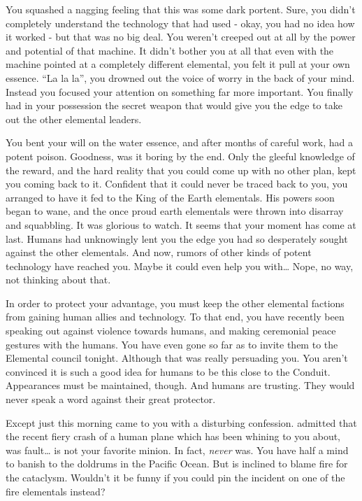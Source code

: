 \documentclass[char]{elementals}
\begin{document}
You squashed a nagging feeling that this was some dark portent. Sure, you didn't completely understand the technology that \cGD{} had used - okay, you had no idea how it worked - but that was no big deal. You weren't creeped out at all by the power and potential of that machine. It didn't bother you at all that even with the machine pointed at a completely different elemental, you felt it pull at your own essence. ``La la la'', you drowned out the voice of worry in the back of your mind. Instead you focused your attention on something far more important. You finally had in your possession the secret weapon that would give you the edge to take out the other elemental leaders.

You bent your will on the water essence, and after months of careful work, had a potent poison. Goodness, was it boring by the end. Only the gleeful knowledge of the reward, and the hard reality that you could come up with no other plan, kept you coming back to it. Confident that it could never be traced back to you, you arranged to have it fed to the King of the Earth elementals. His powers soon began to wane, and the once proud earth elementals were thrown into disarray and squabbling. It was glorious to watch. It seems that your moment has come at last. Humans had unknowingly lent you the edge you had so desperately sought against the other elementals. And now, rumors of other kinds of potent technology have reached you. Maybe it could even help you with{\ldots} Nope, no way, not thinking about that.

In order to protect your advantage, you must keep the other elemental factions from gaining human allies and technology. To that end, you have recently been speaking out against violence towards humans, and making ceremonial peace gestures with the humans. You have even gone so far as to invite them to the Elemental council tonight. Although that was really \cNaturalist{} persuading you. You aren't convinced it is such a good idea for humans to be this close to the Conduit. Appearances must be maintained, though. And humans are trusting. They would never speak a word against their great protector.

Except just this morning \cNaturalist{} came to you with a disturbing confession. \cNaturalist{\They} admitted that the recent fiery crash of a human plane which \cLeader{} has been whining to you about, was \cNaturalist{\their} fault{\ldots} \cNaturalist{} is not your favorite minion. In fact, \cNaturalist{\they} \emph{never} was. You have half a mind to banish \cNaturalist{\their} to the doldrums in the Pacific Ocean. But \cLeader{} is inclined to blame fire for the cataclysm. Wouldn't it be funny if you could pin the incident on one of the fire elementals instead?
\end{document}
